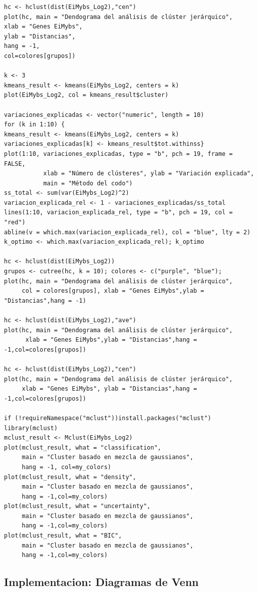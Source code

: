 \documentclass{article}
\begin{document}
\begin{verbatim}
hc <- hclust(dist(EiMybs_Log2),"cen")
plot(hc, main = "Dendograma del análisis de clúster jerárquico",
xlab = "Genes EiMybs",
ylab = "Distancias",
hang = -1,
col=colores[grupos])

k <- 3
kmeans_result <- kmeans(EiMybs_Log2, centers = k)
plot(EiMybs_Log2, col = kmeans_result$cluster)

variaciones_explicadas <- vector("numeric", length = 10)
for (k in 1:10) {
kmeans_result <- kmeans(EiMybs_Log2, centers = k)
variaciones_explicadas[k] <- kmeans_result$tot.withinss}
plot(1:10, variaciones_explicadas, type = "b", pch = 19, frame = FALSE,
           xlab = "Número de clústeres", ylab = "Variación explicada",
           main = "Método del codo")
ss_total <- sum(var(EiMybs_Log2)^2)
variacion_explicada_rel <- 1 - variaciones_explicadas/ss_total
lines(1:10, variacion_explicada_rel, type = "b", pch = 19, col = "red")
abline(v = which.max(variacion_explicada_rel), col = "blue", lty = 2)
k_optimo <- which.max(variacion_explicada_rel); k_optimo

hc <- hclust(dist(EiMybs_Log2))
grupos <- cutree(hc, k = 10); colores <- c("purple", "blue");
plot(hc, main = "Dendograma del análisis de clúster jerárquico",
     col = colores[grupos], xlab = "Genes EiMybs",ylab = "Distancias",hang = -1)

hc <- hclust(dist(EiMybs_Log2),"ave")
plot(hc, main = "Dendograma del análisis de clúster jerárquico",
      xlab = "Genes EiMybs",ylab = "Distancias",hang = -1,col=colores[grupos])

hc <- hclust(dist(EiMybs_Log2),"cen")
plot(hc, main = "Dendograma del análisis de clúster jerárquico",
     xlab = "Genes EiMybs", ylab = "Distancias",hang = -1,col=colores[grupos])

if (!requireNamespace("mclust"))install.packages("mclust")
library(mclust)
mclust_result <- Mclust(EiMybs_Log2)
plot(mclust_result, what = "classification",
     main = "Cluster basado en mezcla de gaussianos",
     hang = -1, col=my_colors)
plot(mclust_result, what = "density",
     main = "Cluster basado en mezcla de gaussianos",
     hang = -1,col=my_colors)
plot(mclust_result, what = "uncertainty",
     main = "Cluster basado en mezcla de gaussianos",
     hang = -1,col=my_colors)
plot(mclust_result, what = "BIC",
     main = "Cluster basado en mezcla de gaussianos",
     hang = -1,col=my_colors)
\end{verbatim}

\subsection{Implementacion: Diagramas de Venn}
\end{document}
